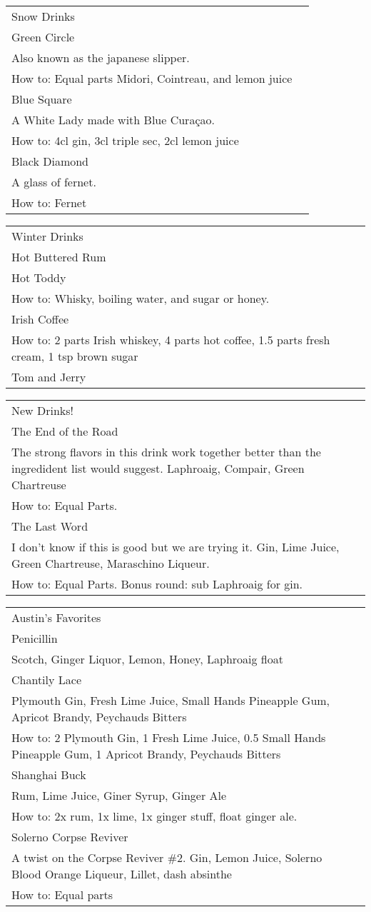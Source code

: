 \documentclass[12pt]{article}
\makeatletter
\newcommand*\ColText[1]{\textcolor{Goldenrod3}{#1}}
\newenvironment{Group}[1]
  {\noindent\begin{tabular*}{\textwidth}{@{}p{.8\linewidth}@{\extracolsep{\fill}}r@{}}
    {\fontsize{24}{29}\selectfont\ColText{#1}}\\[0.8em]}
  {\end{tabular*}}
\newcommand*\Entry[1]{%
  \sffamily#1 \\
}
\newcommand*\Expl[1]{
  \hspace*{1em}\footnotesize #1 \\
}
\newcommand*\HowTo[1]{
  \hspace*{1em}\footnotesize How to: \hspace*{1em}#1 \\
}
\makeatother
\begin{document}
\begin{Group}{Snow Drinks}

\Entry{Green Circle}
\Expl{Also known as the japanese slipper.}
\HowTo{Equal parts Midori, Cointreau, and lemon juice}

\Entry{Blue Square}
\Expl{A White Lady made with Blue Curaçao.}
\HowTo{4cl gin, 3cl triple sec, 2cl lemon juice}

\Entry{Black Diamond}
\Expl{A glass of fernet.}
\HowTo{Fernet}

\end{Group}

\vfill

\begin{Group}{Winter Drinks}
\Entry{Hot Buttered Rum}

\Entry{Hot Toddy}
\HowTo{Whisky, boiling water, and sugar or honey.}

\Entry{Irish Coffee}
\HowTo{2 parts Irish whiskey, 4 parts hot coffee, 1.5 parts fresh cream, 1 tsp brown sugar}

\Entry{Tom and Jerry}
\end{Group}

\vfill

\begin{Group}{New Drinks!}

\Entry{The End of the Road}
\Expl{The strong flavors in this drink work together better than the ingredident list would suggest. Laphroaig, Compair, Green Chartreuse}
\HowTo{Equal Parts.}

\Entry{The Last Word}
\Expl{I don't know if this is good but we are trying it. Gin, Lime Juice, Green Chartreuse, Maraschino Liqueur.}
\HowTo{Equal Parts. Bonus round: sub Laphroaig for gin.}

\end{Group}

\vfill

\begin{Group}{Austin's Favorites}

\Entry{Penicillin}
\Expl{Scotch, Ginger Liquor, Lemon, Honey, Laphroaig float}

\Entry{Chantily Lace}
\Expl{Plymouth Gin, Fresh Lime Juice, Small Hands Pineapple Gum, Apricot Brandy, Peychauds Bitters}
\HowTo{2 Plymouth Gin, 1 Fresh Lime Juice, 0.5 Small Hands Pineapple Gum, 1 Apricot Brandy, Peychauds Bitters}

\Entry{Shanghai Buck}
\Expl{Rum, Lime Juice, Giner Syrup, Ginger Ale}
\HowTo{2x rum, 1x lime, 1x ginger stuff, float ginger ale.}

\Entry{Solerno Corpse Reviver}
\Expl{A twist on the Corpse Reviver \#2. Gin, Lemon Juice, Solerno Blood Orange Liqueur, Lillet, dash absinthe}
\HowTo{Equal parts}

\end{Group}
\end{document}
